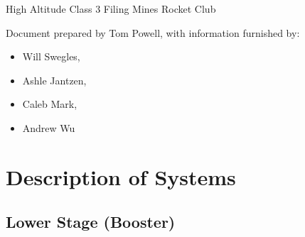 \documentclass[12pt]{article}
\begin{document}
{\noindent\LARGE{}\selectfont High Altitude Class 3 Filing}\newline
{\noindent\Large{}\selectfont Mines Rocket Club}\newline

Document prepared by Tom Powell, with information furnished by:
\begin{itemize}
    \item Will Swegles,
    \item Ashle Jantzen,
    \item Caleb Mark,
    \item Andrew Wu
\end{itemize}
\clearpage
\pagestyle{empty}

\clearpage 
\pagestyle{empty}
\begin{landscape}

\end{landscape}
\clearpage
\pagestyle{fancy}
\newline
\section{Description of Systems}
\subsection{Lower Stage (Booster)}
\end{document}

